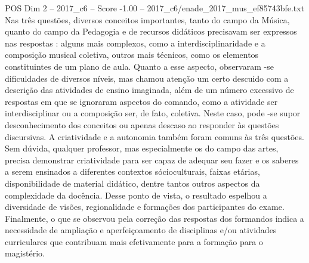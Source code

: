 \begin{textsample}{POS Dim 2 – 2017\_c6 – Score -1.00 – 2017\_c6/enade\_2017\_mus\_ef85743bfe.txt}
Nas três questões, diversos conceitos importantes, tanto do campo da Música, quanto do campo da Pedagogia e de recursos didáticos precisavam ser expressos nas respostas : alguns mais complexos, como a interdisciplinaridade e a composição musical coletiva, outros mais técnicos, como os elementos constituintes de um plano de aula.
Quanto a esse aspecto, observaram -se dificuldades de diversos níveis, mas chamou atenção um certo descuido com a descrição das atividades de ensino imaginada, além de um número excessivo de respostas em que se ignoraram aspectos do comando, como a atividade ser interdisciplinar ou a composição ser, de fato, coletiva.
Neste caso, pode -se supor desconhecimento dos conceitos ou apenas descaso ao responder às questões discursivas.
A criatividade e a autonomia também foram comuns às três questões.
Sem dúvida, qualquer professor, mas especialmente os do campo das artes, precisa demonstrar criatividade para ser capaz de adequar seu fazer e os saberes a serem ensinados a diferentes contextos sócioculturais, faixas etárias, disponibilidade de material didático, dentre tantos outros aspectos da complexidade da docência.
Desse ponto de vista, o resultado espelhou a diversidade de visões, regionalidade e formações dos participantes do exame.
Finalmente, o que se observou pela correção das respostas dos formandos indica a necessidade de ampliação e aperfeiçoamento de disciplinas e/ou atividades curriculares que contribuam mais efetivamente para a formação para o magistério.

\end{textsample}
